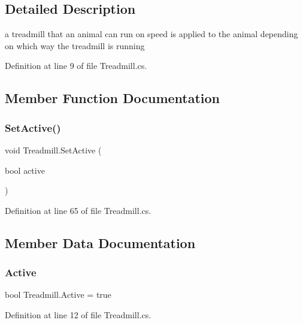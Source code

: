 \subsection{Detailed Description}
a treadmill that an animal can run on speed is applied to the animal depending on which way the treadmill is running 



Definition at line 9 of file Treadmill.\+cs.



\subsection{Member Function Documentation}
\mbox{\label{class_treadmill_a29882cad109f641453b5fea1e763fc13}} 
\subsubsection{\texorpdfstring{Set\+Active()}{SetActive()}}
{\footnotesize\ttfamily void Treadmill.\+Set\+Active (\begin{DoxyParamCaption}\item[{bool}]{active }\end{DoxyParamCaption})}



Definition at line 65 of file Treadmill.\+cs.



\subsection{Member Data Documentation}
\mbox{\label{class_treadmill_ae03f9a4ffbfcbf5f664bda992fb56309}} 
\subsubsection{\texorpdfstring{Active}{Active}}
{\footnotesize\ttfamily bool Treadmill.\+Active = true}



Definition at line 12 of file Treadmill.\+cs.

\mbox{\label{class_treadmill_afa5dca4e017923fd60ece76e0cb7f9af}} 
